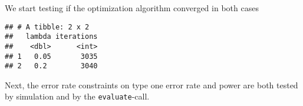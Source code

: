 \documentclass[]{book}
\newenvironment{Shaded}{\begin{snugshade}}{\end{snugshade}}
\newcommand{\DataTypeTok}[1]{\textcolor[rgb]{0.13,0.29,0.53}{#1}}
\newcommand{\KeywordTok}[1]{\textcolor[rgb]{0.13,0.29,0.53}{\textbf{#1}}}
\newcommand{\NormalTok}[1]{#1}
\newcommand{\OperatorTok}[1]{\textcolor[rgb]{0.81,0.36,0.00}{\textbf{#1}}}
\newcommand{\StringTok}[1]{\textcolor[rgb]{0.31,0.60,0.02}{#1}}
\begin{document}
We start testing if the optimization algorithm converged in both cases

\begin{Shaded}
\end{Shaded}

\begin{verbatim}
## # A tibble: 2 x 2
##   lambda iterations
##    <dbl>      <int>
## 1   0.05       3035
## 2   0.2        3040
\end{verbatim}

Next, the error rate constraints on type one error rate and power are both
tested by simulation and by the \texttt{evaluate}-call.
\end{document}
